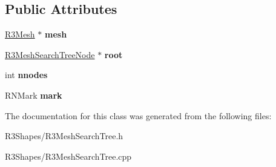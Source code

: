 \subsection*{Public Attributes}
\begin{DoxyCompactItemize}
\item 
\hyperlink{class_r3_mesh}{R3\+Mesh} $\ast$ {\bfseries mesh}\hypertarget{class_r3_mesh_search_tree_a85bca6b99c5c529ea74d7045d16acb7d}{}\label{class_r3_mesh_search_tree_a85bca6b99c5c529ea74d7045d16acb7d}

\item 
\hyperlink{class_r3_mesh_search_tree_node}{R3\+Mesh\+Search\+Tree\+Node} $\ast$ {\bfseries root}\hypertarget{class_r3_mesh_search_tree_a8ad99f6cc83f9700301ccde3359aed13}{}\label{class_r3_mesh_search_tree_a8ad99f6cc83f9700301ccde3359aed13}

\item 
int {\bfseries nnodes}\hypertarget{class_r3_mesh_search_tree_a0f4ce63f17ba752a09a797fded1d5935}{}\label{class_r3_mesh_search_tree_a0f4ce63f17ba752a09a797fded1d5935}

\item 
R\+N\+Mark {\bfseries mark}\hypertarget{class_r3_mesh_search_tree_abb22705e395ef21a8dd8c5eb17ad969b}{}\label{class_r3_mesh_search_tree_abb22705e395ef21a8dd8c5eb17ad969b}

\end{DoxyCompactItemize}


The documentation for this class was generated from the following files\+:\begin{DoxyCompactItemize}
\item 
R3\+Shapes/R3\+Mesh\+Search\+Tree.\+h\item 
R3\+Shapes/R3\+Mesh\+Search\+Tree.\+cpp\end{DoxyCompactItemize}
